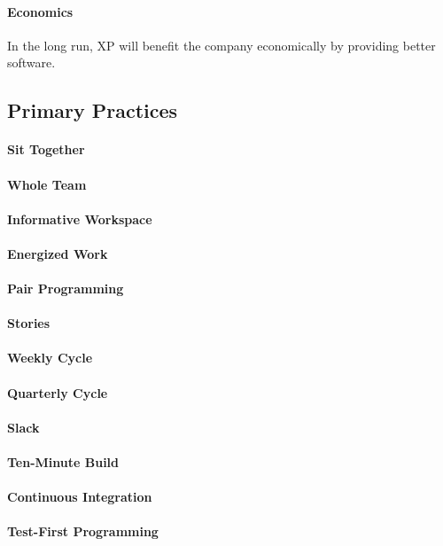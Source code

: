 \documentclass[conference]{IEEEtran}
\begin{document}
\paragraph{Economics} In the long run, XP will benefit the company economically by providing better software.

\subsection{Primary Practices}

\paragraph{Sit Together}
\paragraph{Whole Team}
\paragraph{Informative Workspace}
\paragraph{Energized Work}
\paragraph{Pair Programming}
\paragraph{Stories}
\paragraph{Weekly Cycle}
\paragraph{Quarterly Cycle}
\paragraph{Slack}
\paragraph{Ten-Minute Build}
\paragraph{Continuous Integration}
\paragraph{Test-First Programming}
\end{document}
